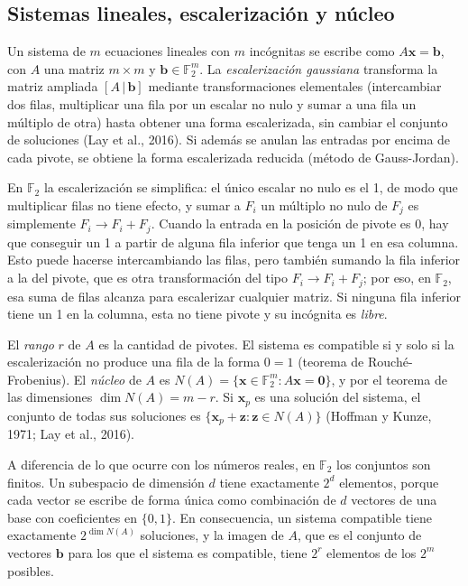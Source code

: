 \documentclass[12pt,a4paper]{article}
\theoremstyle{plain}
\theoremstyle{definition}
\theoremstyle{remark}
\newcommand{\F}{\mathbb{F}_2}
\begin{document}
\subsection{Sistemas lineales, escalerización y núcleo}

Un sistema de $m$ ecuaciones lineales con $m$ incógnitas se escribe como $A\mathbf{x}=\mathbf{b}$, con $A$ una matriz $m\times m$ y $\mathbf{b}\in\F^m$. La \textit{escalerización gaussiana} transforma la matriz ampliada $[A\,|\,\mathbf{b}]$ mediante transformaciones elementales (intercambiar dos filas, multiplicar una fila por un escalar no nulo y sumar a una fila un múltiplo de otra) hasta obtener una forma escalerizada, sin cambiar el conjunto de soluciones (Lay et al., 2016). Si además se anulan las entradas por encima de cada pivote, se obtiene la forma escalerizada reducida (método de Gauss-Jordan).

En $\F$ la escalerización se simplifica: el único escalar no nulo es el 1, de modo que multiplicar filas no tiene efecto, y sumar a $F_i$ un múltiplo no nulo de $F_j$ es simplemente $F_i\to F_i+F_j$. Cuando la entrada en la posición de pivote es 0, hay que conseguir un 1 a partir de alguna fila inferior que tenga un 1 en esa columna. Esto puede hacerse intercambiando las filas, pero también sumando la fila inferior a la del pivote, que es otra transformación del tipo $F_i\to F_i+F_j$; por eso, en $\F$, esa suma de filas alcanza para escalerizar cualquier matriz. Si ninguna fila inferior tiene un 1 en la columna, esta no tiene pivote y su incógnita es \textit{libre}.

El \textit{rango} $r$ de $A$ es la cantidad de pivotes. El sistema es compatible si y solo si la escalerización no produce una fila de la forma $0=1$ (teorema de Rouché-Frobenius). El \textit{núcleo} de $A$ es $N(A)=\{\mathbf{x}\in\F^m : A\mathbf{x}=\mathbf{0}\}$, y por el teorema de las dimensiones $\dim N(A)=m-r$. Si $\mathbf{x}_p$ es una solución del sistema, el conjunto de todas sus soluciones es $\{\mathbf{x}_p+\mathbf{z} : \mathbf{z}\in N(A)\}$ (Hoffman y Kunze, 1971; Lay et al., 2016).

A diferencia de lo que ocurre con los números reales, en $\F$ los conjuntos son finitos. Un subespacio de dimensión $d$ tiene exactamente $2^d$ elementos, porque cada vector se escribe de forma única como combinación de $d$ vectores de una base con coeficientes en $\{0,1\}$. En consecuencia, un sistema compatible tiene exactamente $2^{\dim N(A)}$ soluciones, y la imagen de $A$, que es el conjunto de vectores $\mathbf{b}$ para los que el sistema es compatible, tiene $2^{r}$ elementos de los $2^m$ posibles.
\end{document}
